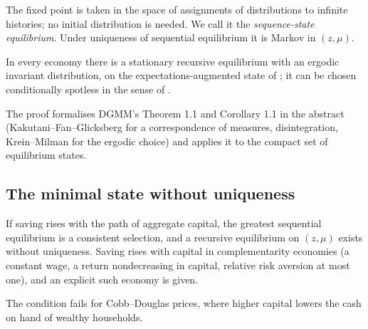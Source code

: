 \noindent
The fixed point is taken in the space of assignments of distributions to infinite histories; no
initial distribution is needed. We call it the \emph{sequence-state equilibrium}. Under uniqueness
of sequential equilibrium it is Markov in $(z,\mu)$.

\begin{theorem}\label{thm:dgmm}
In every economy there is a stationary recursive equilibrium with an ergodic invariant distribution,
on the expectations-augmented state of \citet{dgmm1994}; it can be chosen conditionally spotless in
the sense of \citet[Definition 6]{cao2020}.
\end{theorem}

\noindent
The proof formalises DGMM's Theorem 1.1 and Corollary 1.1 in the abstract (Kakutani--Fan--Glicksberg
for a correspondence of measures, disintegration, Krein--Milman for the ergodic choice) and applies it
to the compact set of equilibrium states.

\subsection{The minimal state without uniqueness}

\begin{theorem}\label{thm:monotone}
If saving rises with the path of aggregate capital, the greatest sequential equilibrium is a
consistent selection, and a recursive equilibrium on $(z,\mu)$ exists without uniqueness. Saving
rises with capital in complementarity economies (a constant wage, a return nondecreasing in capital,
relative risk aversion at most one), and an explicit such economy is given.
\end{theorem}

\noindent
The condition fails for Cobb--Douglas prices, where higher capital lowers the cash on hand of
wealthy households.
